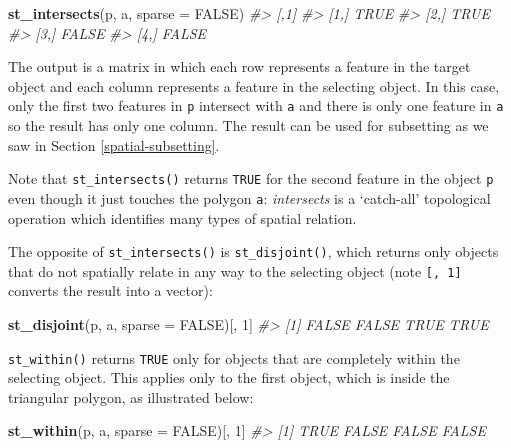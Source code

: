 \documentclass[]{krantz}
\newenvironment{Shaded}{\begin{snugshade}}{\end{snugshade}}
\newcommand{\CommentTok}[1]{\textcolor[rgb]{0.37,0.37,0.37}{\textit{#1}}}
\newcommand{\DataTypeTok}[1]{\textcolor[rgb]{0.27,0.27,0.27}{#1}}
\newcommand{\DecValTok}[1]{\textcolor[rgb]{0.06,0.06,0.06}{#1}}
\newcommand{\KeywordTok}[1]{\textcolor[rgb]{0.27,0.27,0.27}{\textbf{#1}}}
\newcommand{\NormalTok}[1]{#1}
\newcommand{\OtherTok}[1]{\textcolor[rgb]{0.37,0.37,0.37}{#1}}
\begin{document}
\begin{Shaded}
\begin{Highlighting}[]
\KeywordTok{st_intersects}\NormalTok{(p, a, }\DataTypeTok{sparse =} \OtherTok{FALSE}\NormalTok{)}
\CommentTok{#>       [,1]}
\CommentTok{#> [1,]  TRUE}
\CommentTok{#> [2,]  TRUE}
\CommentTok{#> [3,] FALSE}
\CommentTok{#> [4,] FALSE}
\end{Highlighting}
\end{Shaded}

The output is a matrix in which each row represents a feature in the target object and each column represents a feature in the selecting object.
In this case, only the first two features in \texttt{p} intersect with \texttt{a} and there is only one feature in \texttt{a} so the result has only one column.
The result can be used for subsetting as we saw in Section \ref{spatial-subsetting}.

Note that \texttt{st\_intersects()} returns \texttt{TRUE} for the second feature in the object \texttt{p} even though it just touches the polygon \texttt{a}: \emph{intersects} is a `catch-all' topological operation which identifies many types of spatial relation.

The opposite of \texttt{st\_intersects()} is \texttt{st\_disjoint()}, which returns only objects that do not spatially relate in any way to the selecting object (note \texttt{{[},\ 1{]}} converts the result into a vector):

\begin{Shaded}
\begin{Highlighting}[]
\KeywordTok{st_disjoint}\NormalTok{(p, a, }\DataTypeTok{sparse =} \OtherTok{FALSE}\NormalTok{)[, }\DecValTok{1}\NormalTok{]}
\CommentTok{#> [1] FALSE FALSE  TRUE  TRUE}
\end{Highlighting}
\end{Shaded}

\texttt{st\_within()} returns \texttt{TRUE} only for objects that are completely within the selecting object.
This applies only to the first object, which is inside the triangular polygon, as illustrated below:

\begin{Shaded}
\begin{Highlighting}[]
\KeywordTok{st_within}\NormalTok{(p, a, }\DataTypeTok{sparse =} \OtherTok{FALSE}\NormalTok{)[, }\DecValTok{1}\NormalTok{]}
\CommentTok{#> [1]  TRUE FALSE FALSE FALSE}
\end{Highlighting}
\end{Shaded}
\end{document}
